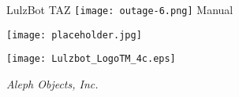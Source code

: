 %
%
%
%
%

\date {}
\thispagestyle{empty}
\begingroup
\centering 

\begin{center}
\fontsize{24pt}{1em}\selectfont LulzBot TAZ
\texttt{[image: outage-6.png]}
\fontsize{24pt}{1em}\selectfont Manual
\end{center}

\par


\texttt{[image: placeholder.jpg]}

\begin{center}
\texttt{[image: Lulzbot\_LogoTM\_4c.eps]}

{\large \itshape Aleph Objects, Inc.}
\end{center}
\endgroup
